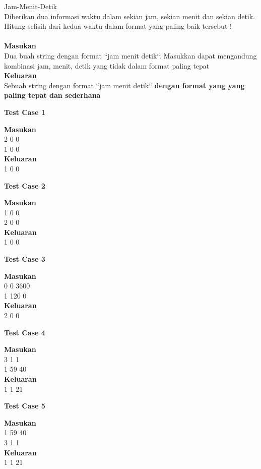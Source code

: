 \newpage
\begin{permasalahan}{Jam-Menit-Detik}\\
\label{prob:Jam-Menit-Detik}
	Diberikan dua informasi waktu dalam sekian jam, sekian menit dan sekian detik. Hitung selisih dari kedua waktu dalam  format yang paling baik tersebut !\\\\
	\textbf{Masukan}\\
	Dua buah string dengan format ``jam menit detik``. Masukkan dapat mengandung kombinasi jam, menit, detik yang tidak dalam format paling tepat \\
	\textbf{Keluaran}\\
	Sebuah string dengan format ``jam menit detik`` \textbf{dengan format yang yang paling tepat dan sederhana}\\
	\begin{center}
	\textbf{Test Case 1}\\
	\end{center}
	\textbf{Masukan}\\
	2 0 0\\
	1 0 0\\
	\textbf{Keluaran}\\
	1 0 0\\
	\begin{center}
	\textbf{Test Case 2}\\
	\end{center}
	\textbf{Masukan}\\
	1 0 0\\
	2 0 0\\
	\textbf{Keluaran}\\
	1 0 0\\
	\begin{center}
	\textbf{Test Case 3}\\
	\end{center}
	\textbf{Masukan}\\
	0 0 3600\\
	1 120 0 \\
	\textbf{Keluaran}\\
	2 0 0\\
	\begin{center}
	\textbf{Test Case 4}\\
	\end{center}
	\textbf{Masukan}\\
	3 1 1\\
	1 59 40 \\
	\textbf{Keluaran}\\
	1 1 21\\
	\begin{center}
	\textbf{Test Case 5}\\
	\end{center}
	\textbf{Masukan}\\
	1 59 40 \\
	3 1 1   \\
	\textbf{Keluaran}\\
	1 1 21\\
\end{permasalahan}

